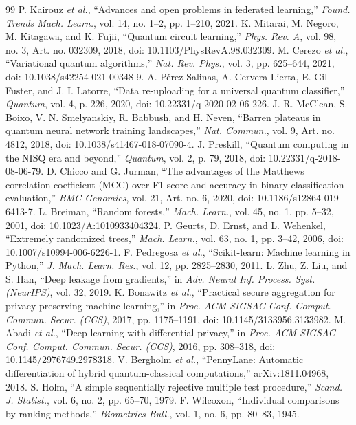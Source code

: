 \documentclass[conference,a4paper]{IEEEtran}
\begin{document}
\begin{thebibliography}{99}
 P. Kairouz \textit{et al.}, ``Advances and open problems in federated learning,'' \textit{Found. Trends Mach. Learn.}, vol. 14, no. 1--2, pp. 1--210, 2021.
 K. Mitarai, M. Negoro, M. Kitagawa, and K. Fujii, ``Quantum circuit learning,'' \textit{Phys. Rev. A}, vol. 98, no. 3, Art. no. 032309, 2018, doi: 10.1103/PhysRevA.98.032309.
 M. Cerezo \textit{et al.}, ``Variational quantum algorithms,'' \textit{Nat. Rev. Phys.}, vol. 3, pp. 625--644, 2021, doi: 10.1038/s42254-021-00348-9.
 A. P\'erez-Salinas, A. Cervera-Lierta, E. Gil-Fuster, and J. I. Latorre, ``Data re-uploading for a universal quantum classifier,'' \textit{Quantum}, vol. 4, p. 226, 2020, doi: 10.22331/q-2020-02-06-226.
 J. R. McClean, S. Boixo, V. N. Smelyanskiy, R. Babbush, and H. Neven, ``Barren plateaus in quantum neural network training landscapes,'' \textit{Nat. Commun.}, vol. 9, Art. no. 4812, 2018, doi: 10.1038/s41467-018-07090-4.
 J. Preskill, ``Quantum computing in the NISQ era and beyond,'' \textit{Quantum}, vol. 2, p. 79, 2018, doi: 10.22331/q-2018-08-06-79.
 D. Chicco and G. Jurman, ``The advantages of the Matthews correlation coefficient (MCC) over F1 score and accuracy in binary classification evaluation,'' \textit{BMC Genomics}, vol. 21, Art. no. 6, 2020, doi: 10.1186/s12864-019-6413-7.
 L. Breiman, ``Random forests,'' \textit{Mach. Learn.}, vol. 45, no. 1, pp. 5--32, 2001, doi: 10.1023/A:1010933404324.
 P. Geurts, D. Ernst, and L. Wehenkel, ``Extremely randomized trees,'' \textit{Mach. Learn.}, vol. 63, no. 1, pp. 3--42, 2006, doi: 10.1007/s10994-006-6226-1.
 F. Pedregosa \textit{et al.}, ``Scikit-learn: Machine learning in Python,'' \textit{J. Mach. Learn. Res.}, vol. 12, pp. 2825--2830, 2011.
 L. Zhu, Z. Liu, and S. Han, ``Deep leakage from gradients,'' in \textit{Adv. Neural Inf. Process. Syst. (NeurIPS)}, vol. 32, 2019.
 K. Bonawitz \textit{et al.}, ``Practical secure aggregation for privacy-preserving machine learning,'' in \textit{Proc. ACM SIGSAC Conf. Comput. Commun. Secur. (CCS)}, 2017, pp. 1175--1191, doi: 10.1145/3133956.3133982.
 M. Abadi \textit{et al.}, ``Deep learning with differential privacy,'' in \textit{Proc. ACM SIGSAC Conf. Comput. Commun. Secur. (CCS)}, 2016, pp. 308--318, doi: 10.1145/2976749.2978318.
 V. Bergholm \textit{et al.}, ``PennyLane: Automatic differentiation of hybrid quantum-classical computations,'' arXiv:1811.04968, 2018.
 S. Holm, ``A simple sequentially rejective multiple test procedure,'' \textit{Scand. J. Statist.}, vol. 6, no. 2, pp. 65--70, 1979.
 F. Wilcoxon, ``Individual comparisons by ranking methods,'' \textit{Biometrics Bull.}, vol. 1, no. 6, pp. 80--83, 1945.
\end{thebibliography}
\end{document}
